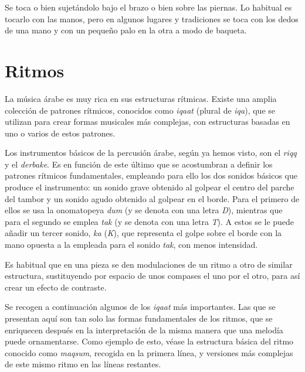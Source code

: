         Se toca o bien sujetándolo bajo el brazo o bien sobre las piernas. Lo habitual es tocarlo con las manos, pero en algunos lugares y tradiciones se toca con los dedos de una mano y con un pequeño palo en la otra a modo de baqueta.



\section{Ritmos}

La música árabe es muy rica en sus estructuras rítmicas. Existe una amplia colección de patrones rítmicos, conocidos como \emph{iqaat} (plural de \emph{iqa}), que se utilizan para crear formas musicales más complejas, con estructuras basadas en uno o varios de estos patrones.

Los instrumentos básicos de la percusión árabe, según ya hemos visto, son el \emph{riqq} y el \emph{derbake}. Es en función de este último que se acostumbran a definir los patrones rítmicos fundamentales, empleando para ello los dos sonidos básicos que produce el instrumento: un sonido grave obtenido al golpear el centro del parche del tambor y un sonido agudo obtenido al golpear en el borde. Para el primero de ellos se usa la onomatopeya \emph{dum} (y se denota con una letra \emph{D}), mientras que para el segundo se emplea \emph{tak} (y se denota con una letra \emph{T}). A estos se le puede añadir un tercer sonido, \emph{ka} (\emph{K}), que representa el golpe sobre el borde con la mano opuesta a la empleada para el sonido \emph{tak}, con menos intensidad.

Es habitual que en una pieza se den modulaciones de un ritmo a otro de similar estructura, sustituyendo por espacio de unos compases el uno por el otro, para así crear un efecto de contraste.

Se recogen a continuación algunos de los \emph{iqaat} más importantes. Las que se presentan aquí son tan solo las formas fundamentales de los ritmos, que se enriquecen después en la interpretación de la misma manera que una melodía puede ornamentarse. Como ejemplo de esto, véase la estructura básica del ritmo conocido como \emph{maqsum}, recogida en la primera línea, y versiones más complejas de este mismo ritmo en las líneas restantes.

